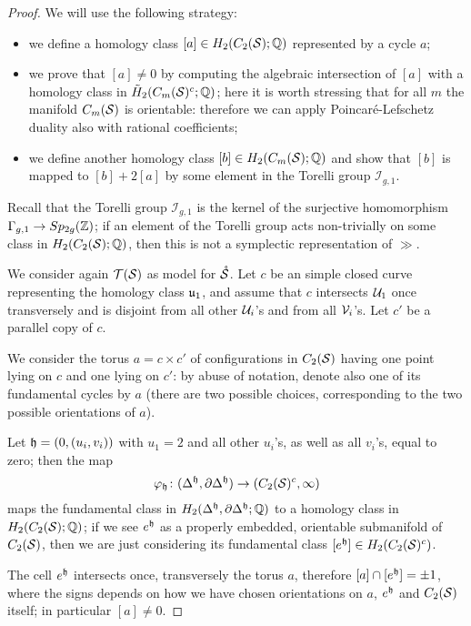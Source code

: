 \begin{proof}
 We will use the following strategy:
 \begin{itemize}
  \item we define a homology class $[a]\in H_2(C_2(\S);\Q)$ represented by a cycle $a$;
  \item we prove that $[a]\neq 0$ by computing the algebraic intersection of
  $[a]$ with a homology class
  in $\tH_2(\cms^c;\Q)$; here it is worth stressing that for all $m$ the manifold
  $\cms$ is orientable: therefore we can apply Poincaré-Lefschetz duality
  also with rational coefficients;
  \item we define another homology class $[b]\in H_2(\cms;\Q)$ and show that
  $[b]$ is mapped to $[b]+2[a]$ by some element in the Torelli group $\mathcal{I}_{g,1}$.
 \end{itemize}
Recall that the Torelli group $\mathcal{I}_{g,1}$ is the kernel of the surjective homomorphism
$\gg\to Sp_{2g}(\Z)$; if an element of the Torelli group acts non-trivially on
some class in $H_2(C_2(\S);\Q)$, then this is not a symplectic representation of $\gg$.

We consider again $\T(\S)$ as model for $\mrS$. Let $c$ be an simple closed curve
representing the homology class $\u_1$, and assume that $c$ intersects $\U_1$ once
transversely and is disjoint from all other $\U_i$'s and from all $\V_i$'s. Let $c'$
be a parallel copy of $c$.

We consider the torus $a=c\times c'$ of configurations in $C_2(\S)$ having one point lying on $c$ and
one lying on $c'$: by abuse of notation, denote also one of its fundamental cycles by $a$
(there are two possible choices, corresponding to the two possible orientations of $a$).

Let $\tup=(0,(u_i,v_i))$ with $u_1=2$ and all other $u_i$'s, as well as all $v_i$'s, equal to zero;
then the map
\[
\phi_{\tup}\colon (\Delta^{\tup},\partial\Delta^{\tup})\to (C_2(\S)^c,\infty)
\]
maps the fundamental class in $H_2(\Delta^{\tup},\partial\Delta^{\tup};\Q)$ to a homology
class in $H_2(C_2(\S);\Q)$; if we see $e^{\tup}$ as a properly embedded, orientable submanifold
of $C_2(\S)$, then we are just considering its fundamental class $[e^{\tup}]\in H_2(C_2(\S)^c)$.

The cell $e^{\tup}$ intersects once, transversely the torus $a$, therefore $[a]\cap[e^{\tup}]=\pm 1$,
where the signs depends on how we have chosen orientations on $a$, $e^{\tup}$ and $C_2(\S)$ itself;
in particular $[a]\neq 0$.


\end{proof}
